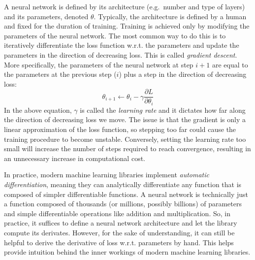 \documentclass[12pt]{article}
\begin{document}
A neural network is defined by its architecture (e.g.\ number and type of layers) and its parameters, denoted $\theta$. Typically, the architecture is defined by a human and fixed for the duration of training. Training is achieved only by modifying the parameters of the neural network. The most common way to do this is to iteratively differentiate the loss function w.r.t. the parameters and update the parameters in the direction of decreasing loss. This is called \textit{gradient descent}. More specifically, the parameters of the neural network at step $i+1$ are equal to the parameters at the previous step ($i$) plus a step in the direction of decreasing loss:
\begin{equation}
\theta_{i+1} \leftarrow \theta_{i} - \gamma \frac{\partial L}{\partial \theta_i}
\label{eq_sgd}
\end{equation}
In the above equation, $\gamma$ is called the \textit{learning rate} and it dictates how far along the direction of decreasing loss we move. The issue is that the gradient is only a linear approximation of the loss function, so stepping too far could cause the training procedure to become unstable. Conversely, setting the learning rate too small will increase the number of steps required to reach convergence, resulting in an unnecessary increase in computational cost.

In practice, modern machine learning libraries implement \textit{automatic differentiation}, meaning they can analytically differentiate any function that is composed of simpler differentiable functions. A neural network is technically just a function composed of thousands (or millions, possibly billions) of parameters and simple differentiable operations like addition and multiplication. So, in practice, it suffices to define a neural network architecture and let the library compute its derivates. However, for the sake of understanding, it can still be helpful to derive the derivative of loss w.r.t. parameters by hand. This helps provide intuition behind the inner workings of modern machine learning libraries.
\end{document}
